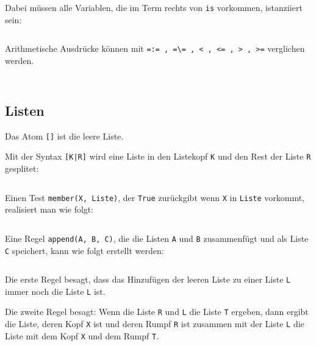 \inputminted[numbersep=5pt, tabsize=4]{prolog}{scripts/prolog/arithmetik.pl}

Dabei müssen alle Variablen, die im Term rechts von \texttt{is} vorkommen,
istanziiert sein:

\inputminted[numbersep=5pt, tabsize=4]{prolog}{scripts/prolog/arithmetik-fail.pl}

Arithmetische Ausdrücke können mit \texttt{=:= , =\textbackslash= , < , <= , > , >=}
verglichen werden.

\begin{beispiel}
    \begin{bspenum}
        \item \inputminted[numbersep=5pt, tabsize=4]{prolog}{scripts/prolog/even.pl}
        \item \inputminted[numbersep=5pt, tabsize=4]{prolog}{scripts/prolog/fibonacci2.pl}
    \end{bspenum}
\end{beispiel}

\subsection{Listen}
Das Atom \texttt{[]} ist die leere Liste.

Mit der Syntax \texttt{[K|R]} wird eine Liste in den Listekopf \texttt{K} und
den Rest der Liste \texttt{R} gesplitet:

\inputminted[numbersep=5pt, tabsize=4]{prolog}{scripts/prolog/liste-basic.pl}

Einen Test \texttt{member(X, Liste)}, der \texttt{True} zurückgibt wenn \texttt{X}
in \texttt{Liste} vorkommt, realisiert man wie folgt:

\inputminted[numbersep=5pt, tabsize=4]{prolog}{scripts/prolog/liste-member.pl}

Eine Regel \texttt{append(A, B, C)}, die die Listen \texttt{A} und \texttt{B}
zusammenfügt und als Liste \texttt{C} speichert, kann
wie folgt erstellt werden:

\inputminted[numbersep=5pt, tabsize=4]{prolog}{scripts/prolog/liste-append.pl}

Die erste Regel besagt, dass das Hinzufügen der leeren Liste zu einer Liste
\texttt{L} immer noch die Liste \texttt{L} ist.

Die zweite Regel besagt: Wenn die Liste \texttt{R} und \texttt{L} die Liste \texttt{T}
ergeben, dann ergibt die Liste, deren Kopf \texttt{X} ist und deren Rumpf \texttt{R}
ist zusammen mit der Liste \texttt{L} die Liste mit dem Kopf \texttt{X} und dem
Rumpf \texttt{T}.


